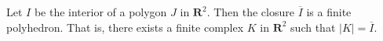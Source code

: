 Let $I$ be the interior of a polygon $J$ in $\mathbf{R}^2$. Then the closure $\overline{I}$ is a finite polyhedron. That is, there exists a finite complex $K$ in $\mathbf{R}^2$ such that $|K| = \overline{I}$.
